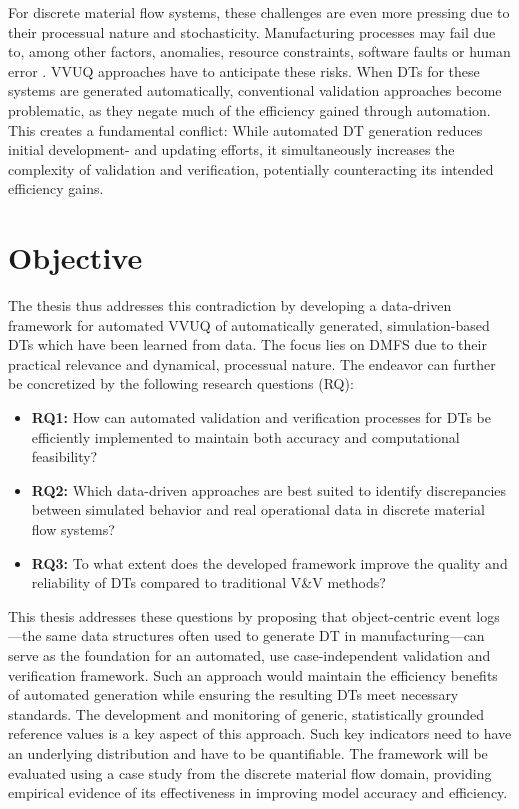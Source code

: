 For discrete material flow systems, these challenges are even more pressing due to their processual nature and stochasticity. Manufacturing processes may fail due to, among other factors, anomalies, resource constraints, software faults or human error \parencite{chenganomalies}. VVUQ approaches have to anticipate these risks. When DTs for these systems are generated automatically, conventional validation approaches become problematic, as they negate much of the efficiency gained through automation. This creates a fundamental conflict: While automated DT generation reduces initial development- and updating efforts, it simultaneously increases the complexity of validation and verification, potentially counteracting its intended efficiency gains.

\section{Objective}

The thesis thus addresses this contradiction by developing a data-driven framework for automated VVUQ of automatically generated, simulation-based DTs which have been learned from data. The focus lies on DMFS due to their practical relevance and dynamical, processual nature. The endeavor can further be concretized by the following research questions (RQ):

\begin{itemize}
  \item \textbf{RQ1:} How can automated validation and verification processes for DTs be efficiently implemented to maintain both accuracy and computational feasibility?
  \item \textbf{RQ2:} Which data-driven approaches are best suited to identify discrepancies between simulated behavior and real operational data in discrete material flow systems?
  \item \textbf{RQ3:} To what extent does the developed framework improve the quality and reliability of DTs compared to traditional V&V methods?
\end{itemize}

This thesis addresses these questions by proposing that object-centric event logs—the same data structures often used to generate DT in manufacturing—can serve as the foundation for an automated, use case-independent validation and verification framework. Such an approach would maintain the efficiency benefits of automated generation while ensuring the resulting DTs meet necessary standards. The development and monitoring of generic, statistically grounded reference values is a key aspect of this approach. Such key indicators need to have an underlying distribution and have to be quantifiable. The framework will be evaluated using a case study from the discrete material flow domain, providing empirical evidence of its effectiveness in improving model accuracy and efficiency.

